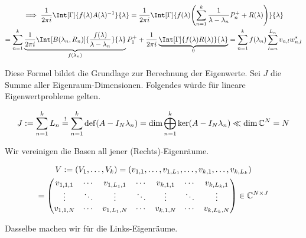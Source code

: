\begin{multline*}
    \implies
    \frac{1}{2 \pi i}
    \Int[\Gamma]
    {
        f(\lambda) A(\lambda)^{-1}
    }{\lambda}
    =
    \frac{1}{2 \pi i}
    \Int[\Gamma]
    {
        f(\lambda)
        \pbraces
        {
            \sum_{n=1}^k
                \frac{1}{\lambda - \lambda_n} P_n^+
                +
                R(\lambda)
        }
    }{\lambda} \\
    =
    \sum_{n=1}^k
        \underbrace
        {
            \frac{1}{2 \pi i}
            \Int[B(\lambda_n, R_n)]
            {
                \frac{f(\lambda)}{\lambda - \lambda_n}
            }{\lambda}
        }_{f(\lambda_n)}
        P_1^+
    +
    \frac{1}{2 \pi i}
    \underbrace
    {
        \Int[\Gamma]
        {
            f(\lambda) R(\lambda)
        }{\lambda}
    }_0
    =
    \sum_{n=1}^k
        f(\lambda_n)
        \sum_{l=n}^{L_n}
            v_{n, l} w_{n, l}^\ast
\end{multline*}

Diese Formel bildet die Grundlage zur Berechnung der Eigenwerte.
Sei $J$ die Summe aller Eigenraum-Dimensionen.
Folgendes würde für lineare Eigenwertprobleme gelten.

\begin{align*}
    J
    :=
    \sum_{n=1}^k
        L_n
    \stackrel{!}{=}
    \sum_{n=1}^k
        \operatorname{def}(A - I_N \lambda_n)
    =
    \dim
    \bigoplus_{n=1}^k
        \operatorname{ker}(A - I_N \lambda_n)
    \ll
    \dim \mathbb{C}^N
    =
    N
\end{align*}

Wir vereinigen die Basen all jener (Rechts)-Eigenräume.

\begin{multline*}
    V
    :=
    (V_1, \dots, V_k)
    =
    (v_{1, 1}, \dots, v_{1, L_1}, \dots, v_{k, 1}, \dots, v_{k, L_k}) \\
    =
    \begin{pmatrix}
        v_{1, 1, 1} & \cdots & v_{1, L_1, 1} & \cdots & v_{k, 1, 1} & \cdots & v_{k, L_k, 1} \\
        \vdots      & \ddots & \vdots        & \ddots & \vdots      & \ddots & \vdots        \\
        v_{1, 1, N} & \cdots & v_{1, L_1, N} & \cdots & v_{k, 1, N} & \cdots & v_{k, L_k, N}
    \end{pmatrix}
    \in
    \mathbb{C}^{N \times J}
\end{multline*}

Dasselbe machen wir für die Links-Eigenräume.

